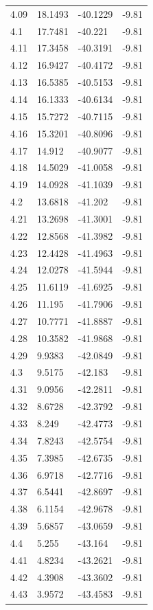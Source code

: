 \begin{tabular}{llll}
4.09 & 18.1493 & -40.1229 & -9.81 \\
4.1 & 17.7481 & -40.221 & -9.81 \\
4.11 & 17.3458 & -40.3191 & -9.81 \\
4.12 & 16.9427 & -40.4172 & -9.81 \\
4.13 & 16.5385 & -40.5153 & -9.81 \\
4.14 & 16.1333 & -40.6134 & -9.81 \\
4.15 & 15.7272 & -40.7115 & -9.81 \\
4.16 & 15.3201 & -40.8096 & -9.81 \\
4.17 & 14.912 & -40.9077 & -9.81 \\
4.18 & 14.5029 & -41.0058 & -9.81 \\
4.19 & 14.0928 & -41.1039 & -9.81 \\
4.2 & 13.6818 & -41.202 & -9.81 \\
4.21 & 13.2698 & -41.3001 & -9.81 \\
4.22 & 12.8568 & -41.3982 & -9.81 \\
4.23 & 12.4428 & -41.4963 & -9.81 \\
4.24 & 12.0278 & -41.5944 & -9.81 \\
4.25 & 11.6119 & -41.6925 & -9.81 \\
4.26 & 11.195 & -41.7906 & -9.81 \\
4.27 & 10.7771 & -41.8887 & -9.81 \\
4.28 & 10.3582 & -41.9868 & -9.81 \\
4.29 & 9.9383 & -42.0849 & -9.81 \\
4.3 & 9.5175 & -42.183 & -9.81 \\
4.31 & 9.0956 & -42.2811 & -9.81 \\
4.32 & 8.6728 & -42.3792 & -9.81 \\
4.33 & 8.249 & -42.4773 & -9.81 \\
4.34 & 7.8243 & -42.5754 & -9.81 \\
4.35 & 7.3985 & -42.6735 & -9.81 \\
4.36 & 6.9718 & -42.7716 & -9.81 \\
4.37 & 6.5441 & -42.8697 & -9.81 \\
4.38 & 6.1154 & -42.9678 & -9.81 \\
4.39 & 5.6857 & -43.0659 & -9.81 \\
4.4 & 5.255 & -43.164 & -9.81 \\
4.41 & 4.8234 & -43.2621 & -9.81 \\
4.42 & 4.3908 & -43.3602 & -9.81 \\
4.43 & 3.9572 & -43.4583 & -9.81 \\

\end{tabular}
